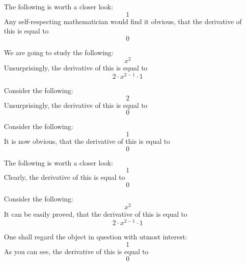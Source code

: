 \documentclass{article}
\begin{document}
The following is worth a closer look:
\begin{equation}
1 
\end{equation}
Any self-respecting mathematician would find it obvious, that the derivative of this is equal to
\begin{equation}
0 
\end{equation}

We are going to study the following:
\begin{equation}
x ^{2 } 
\end{equation}
Unsurprisingly, the derivative of this is equal to
\begin{equation}
2 \cdot x ^{2 - 1 } \cdot 1 
\end{equation}

Consider the following:
\begin{equation}
2 
\end{equation}
Unsurprisingly, the derivative of this is equal to
\begin{equation}
0 
\end{equation}

Consider the following:
\begin{equation}
1 
\end{equation}
It is now obvious, that the derivative of this is equal to
\begin{equation}
0 
\end{equation}

The following is worth a closer look:
\begin{equation}
1 
\end{equation}
Clearly, the derivative of this is equal to
\begin{equation}
0 
\end{equation}

Consider the following:
\begin{equation}
x ^{2 } 
\end{equation}
It can be easily proved, that the derivative of this is equal to
\begin{equation}
2 \cdot x ^{2 - 1 } \cdot 1 
\end{equation}

One shall regard the object in question with utmost interest:
\begin{equation}
1 
\end{equation}
As you can see, the derivative of this is equal to
\begin{equation}
0 
\end{equation}
\end{document}
